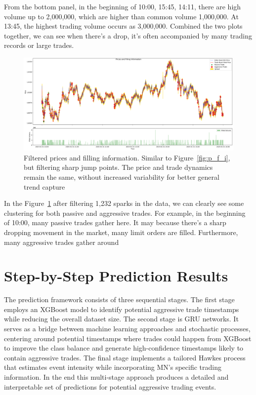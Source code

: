 From the bottom panel, in the beginning of 10:00, 15:45, 14:11, there are high volume up to 2,000,000, which are higher than common volume 1,000,000. At 13:45, the highest trading volume occurs as 3,000,000. Combined the two plots together, we can see when there's a drop, it's often accompanied by many trading records or large trades. 

\begin{figure}[h]
    \centering
    \includegraphics[width=1\linewidth]{figures/Filtered Prices and Filling Information.png}
    \caption{Filtered prices and filling information. Similar to Figure~\ref{fig:p_f_i}, but filtering sharp jump points. The price and trade dynamics remain the same, without increased variability for better general trend capture}
    \label{fig:f_p_f_i}
\end{figure}

In the Figure~\ref{fig:f_p_f_i} after filtering 1,232 sparks in the data, we can clearly see some clustering for both passive and aggressive trades. For example, in the beginning of 10:00, many passive trades gather here. It may because there's a sharp dropping movement in the market, many limit orders are filled. Furthermore, many aggressive trades gather around  


\section{Step-by-Step Prediction Results}
The prediction framework consists of three sequential stages. The first stage employs an XGBoost model to identify potential aggressive trade timestamps while reducing the overall dataset size. The second stage is GRU networks. It serves as a bridge between machine learning approaches and stochastic processes, centering around potential timestamps where trades could happen from XGBoost to improve the class balance and generate high-confidence timestamps likely to contain aggressive trades. The final stage implements a tailored Hawkes process that estimates event intensity while incorporating MN's specific trading information. In the end this multi-stage approach produces a detailed and interpretable set of predictions for potential aggressive trading events.

